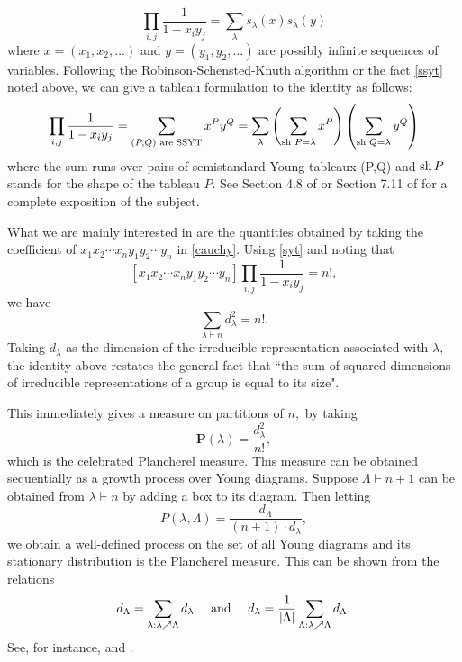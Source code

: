 \documentclass[11pt]{amsart}
\begin{document}
\begin{equation}\label{cauchy}
    \prod_{i,j}\frac{1}{1-x_iy_j}=\sum_{\lambda}s_{\lambda}(x)s_{\lambda}(y)
\end{equation}
where $x=(x_1,x_2,\ldots)$ and $y=(y_1,y_2,\ldots)$ are possibly infinite sequences of variables. Following the Robinson-Schensted-Knuth algorithm or the fact \eqref{ssyt} noted above, we can give a tableau formulation to the identity as follows:
\[\prod_{i,j}\frac{1}{1-x_iy_j}=\sum_{(P,Q) \textnormal{ are SSYT}}x^P y^ Q = \sum_{\lambda} \left(\sum_{\textnormal{sh }P=\lambda} x^P\right) \left(\sum_{\textnormal{sh }Q=\lambda} y^Q\right)\]
where the sum runs over pairs of semistandard Young tableaux (P,Q) and $\textnormal{sh} \, P$ stands for the shape of the tableau $P.$ See Section 4.8 of \cite{S01} or Section 7.11 of \cite{S99} for a complete exposition of the subject.

What we are mainly interested in are the quantities obtained by taking the coefficient of $x_1 x_2 \cdots x_n y_1 y_2 \cdots y_n$ in \eqref{cauchy}. Using \eqref{syt} and noting that
\[[x_1 x_2 \cdots x_n y_1 y_2 \cdots y_n] \prod_{i,j}\frac{1}{1-x_iy_j}=n!,\]
we have 
\[\sum_{\lambda \vdash n}d_{\lambda}^2=n!.\]
Taking $d_{\lambda}$ as the dimension of the irreducible representation associated with $\lambda,$ the identity above restates the general fact that ``the sum of squared dimensions of irreducible representations of a group is equal to its size".

This immediately gives a measure on partitions of $n,$ by taking 
\begin{equation}\label{plancherel}
 \mathbf{P}(\lambda)=\frac{d_{\lambda}^2}{n!},   
\end{equation}
which is the celebrated Plancherel measure. This measure can be obtained sequentially as a growth process over Young diagrams. Suppose $\Lambda \vdash n+1$ can be obtained from $\lambda \vdash n$ by adding a box to its diagram. Then letting
\[P(\lambda,\Lambda)=\frac{d_{\Lambda}}{(n+1) \cdot d_{\lambda}},\]
we obtain a well-defined process on the set of all Young diagrams and its stationary distribution is the Plancherel measure. This can be shown from the relations
\begin{equation}\label{growth}
d_{\Lambda} = \sum_{\lambda: \lambda \nearrow \Lambda} d_{\lambda} \quad \textnormal{ and } \quad d_{\lambda} = \frac{1}{|\Lambda|} \sum_{\Lambda: \lambda \nearrow \Lambda} d_{\Lambda}.
\end{equation}
See, for instance, \cite{K94} and \cite{K96}.
\end{document}
